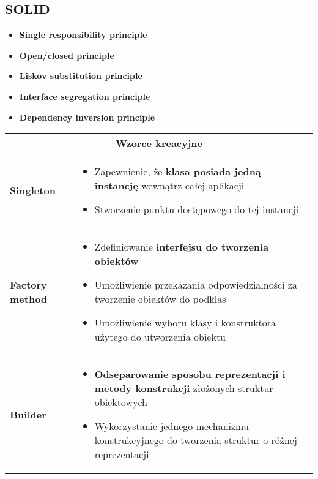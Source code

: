 \documentclass[a4paper]{article}
\begin{document}
    \subsection{SOLID}

    \begin{itemize}
        \item \textbf{Single responsibility principle}
        \item \textbf{Open/closed principle}
        \item \textbf{Liskov substitution principle}
        \item \textbf{Interface segregation principle}
        \item \textbf{Dependency inversion principle}
    \end{itemize}


    \begin{table}[H]
        \begin{center}
            \begin{tabular}{  p{3cm} p{12cm}  }
                \toprule
                \multicolumn{2}{c}{Wzorce kreacyjne} \\
                \toprule

                \textbf{Singleton}
                &
                \begin{itemize}
                    \item Zapewnienie, że \textbf{klasa posiada jedną instancję} wewnątrz całej aplikacji
                    \item Stworzenie punktu dostępowego do tej instancji
                \end{itemize}
                \\

                \cmidrule(r){1-1}\cmidrule(l){2-2}
                \textbf{Factory method}
                &
                \begin{itemize}
                    \item Zdefiniowanie \textbf{interfejsu do tworzenia obiektów}
                    \item Umożliwienie przekazania odpowiedzialności za tworzenie obiektów do podklas
                    \item Umożliwienie wyboru klasy i konstruktora użytego do utworzenia obiektu
                \end{itemize}
                \\

                \cmidrule(r){1-1}\cmidrule(l){2-2}
                \textbf{Builder}
                &
                \begin{itemize}
                    \item \textbf{Odseparowanie sposobu reprezentacji i metody konstrukcji} złożonych struktur obiektowych
                    \item Wykorzystanie jednego mechanizmu konstrukcyjnego do tworzenia struktur o różnej reprezentacji
                \end{itemize} \\


\end{tabular}
\end{center}
\end{table}
\end{document}
